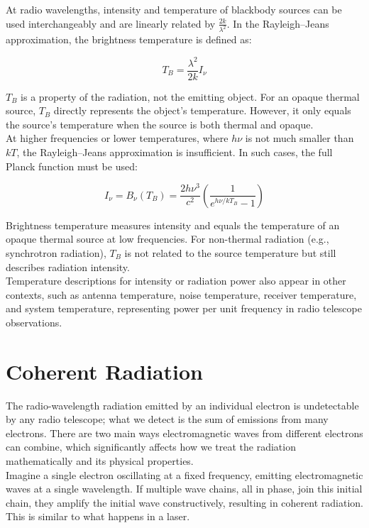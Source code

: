 At radio wavelengths, intensity and temperature of blackbody sources can be used interchangeably and are linearly related by \( \frac{2k}{\lambda^2} \). In the Rayleigh–Jeans approximation, the brightness temperature is defined as:

\[
T_B = \frac{\lambda^2}{2k} I_\nu
\]

\( T_B \) is a property of the radiation, not the emitting object. For an opaque thermal source, \( T_B \) directly represents the object's temperature. However, it only equals the source's temperature when the source is both thermal and opaque. \\

At higher frequencies or lower temperatures, where \( h\nu \) is not much smaller than \( kT \), the Rayleigh–Jeans approximation is insufficient. In such cases, the full Planck function must be used:

\[
I_\nu = B_\nu(T_B) = \frac{2h\nu^3}{c^2} \left( \frac{1}{e^{h\nu/kT_B} - 1} \right)
\]

Brightness temperature measures intensity and equals the temperature of an opaque thermal source at low frequencies. For non-thermal radiation (e.g., synchrotron radiation), \( T_B \) is not related to the source temperature but still describes radiation intensity. \\

Temperature descriptions for intensity or radiation power also appear in other contexts, such as antenna temperature, noise temperature, receiver temperature, and system temperature, representing power per unit frequency in radio telescope observations. \\

\clearpage

\section{Coherent Radiation}

The radio-wavelength radiation emitted by an individual electron is undetectable by any radio telescope; what we detect is the sum of emissions from many electrons. There are two main ways electromagnetic waves from different electrons can combine, which significantly affects how we treat the radiation mathematically and its physical properties. \\

Imagine a single electron oscillating at a fixed frequency, emitting electromagnetic waves at a single wavelength. If multiple wave chains, all in phase, join this initial chain, they amplify the initial wave constructively, resulting in coherent radiation. This is similar to what happens in a laser. \\

